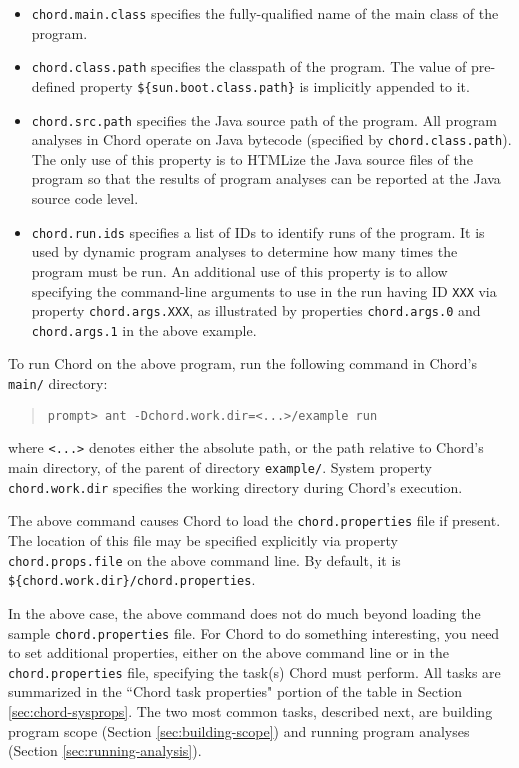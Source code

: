 \begin{itemize}
\item
\verb+chord.main.class+ specifies the fully-qualified name of the main class of the
program.
\item
\verb+chord.class.path+ specifies the classpath of the program.
The value of pre-defined property \verb+${sun.boot.class.path}+ is implicitly appended
to it.
\item
\verb+chord.src.path+ specifies the Java source path of the program.
All program analyses in Chord operate on Java bytecode (specified by \verb+chord.class.path+).
The only use of this property is to HTMLize the Java source files of the program so that the
results of program analyses can be reported at the Java source code level.
\item
\verb+chord.run.ids+ specifies a list of IDs to identify runs of the program.
It is used by dynamic program analyses to determine how many times the program must be run.
An additional use of this property is to allow specifying the command-line arguments to use
in the run having ID \verb+XXX+ via property \verb+chord.args.XXX+, as illustrated by
properties \verb+chord.args.0+ and \verb+chord.args.1+ in the above example.
\end{itemize}

To run Chord on the above program, run the following command in Chord's \verb+main/+ directory:

\begin{quote}
\begin{verbatim}
prompt> ant -Dchord.work.dir=<...>/example run
\end{verbatim}
\end{quote}

where \verb+<...>+ denotes either the absolute path, or the path relative to Chord's main directory,
of the parent of directory {\tt example/}.
System property \verb+chord.work.dir+ specifies the working directory during Chord's execution.

The above command causes Chord to load the \verb+chord.properties+ file if present.
The location of this file may be specified explicitly via property
\verb+chord.props.file+ on the above command line.
By default, it is \verb+${chord.work.dir}/chord.properties+.

In the above case, the above command does not do much beyond loading the sample \verb+chord.properties+ file.
For Chord to do something interesting, you need to set additional properties, either
on the above command line or in the \verb+chord.properties+ file, specifying the task(s)
Chord must perform.
All tasks are summarized in the ``Chord task properties" portion of the table in Section \ref{sec:chord-sysprops}.
The two most common tasks, described next, are building program scope (Section \ref{sec:building-scope})
and running program analyses (Section \ref{sec:running-analysis}).

